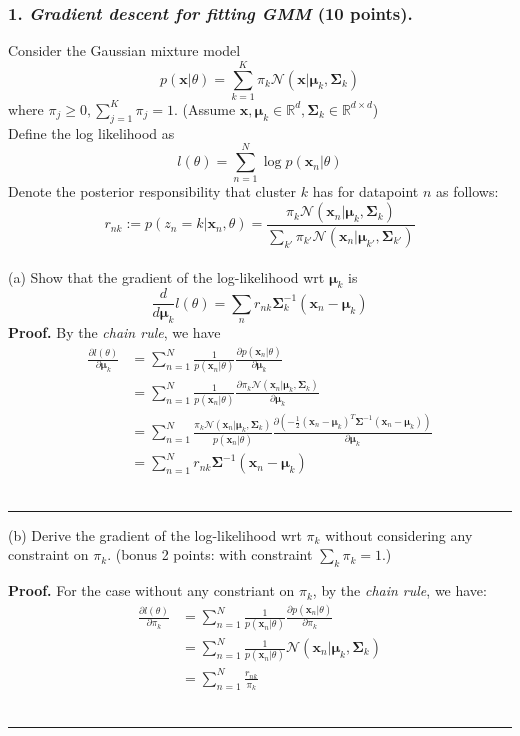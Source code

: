 \documentclass[12pt]{article}%
\newenvironment{proof}[1][Proof]{\textbf{#1.} }{\ \rule{0.5em}{0.5em}}
\newcommand{\PARTIAL}[2]{\frac{\partial #1}{\partial #2}}
\renewcommand{\b}[1]{\boldsymbol{#1}}
\begin{document}
\subsubsection*{1. \textit{Gradient descent for fitting GMM} (10 points).}
Consider the Gaussian mixture model
\[p(\mathbf{x}|\theta)=\sum_{k=1}^K \pi_k \mathcal{N}(\mathbf{x}|\boldsymbol{\mu}_k,\boldsymbol{\Sigma}_k)\]
\indent where $\pi_j\geq 0, \sum_{j=1}^K\pi_j = 1$. (Assume $\mathbf{x},\boldsymbol{\mu}_k\in \mathbb{R}^d,\boldsymbol{\Sigma}_k\in \mathbb{R}^{d\times d}$)
\vspace{1em}
\\
 Define the log likelihood as
\[ l(\theta) = \sum_{n=1}^N \log p(\mathbf{x}_n|\theta)
\]
 Denote the posterior responsibility that cluster $k$ has for datapoint $n$ as follows:
\[
r_{nk}:=p(z_n=k|\mathbf{x}_n,\theta) = \frac{\pi_k\mathcal{N}(\mathbf{x}_n|\boldsymbol{\mu}_k,\boldsymbol{\Sigma}_k)}{\sum_{k'}\pi_{k'}\mathcal{N}(\mathbf{x}_n|\boldsymbol{\mu}_{k'},\boldsymbol{\Sigma}_{k'})}
\]
\\
(a) Show that the gradient of the log-likelihood wrt $\boldsymbol{\mu}_k$ is
	\[ \frac{d}{d\boldsymbol{\mu}_k}l(\theta) = \sum_n r_{nk}\boldsymbol{\Sigma}_k^{-1}(\mathbf{x}_n-\boldsymbol{\mu}_k)
	\]
	\vspace{1em}
    \begin{proof}
        By the {\it chain rule}, we have 
        \begin{align*}
            \PARTIAL{l(\theta)}{\b{\mu}_k}
            &=\sum_{n=1}^N \frac{1}{p(\b{x}_n|\theta)}\PARTIAL{p(\b{x}_n|\theta)}{\b{\mu}_k}\\
            &=\sum_{n=1}^N \frac{1}{p(\b{x}_n|\theta)}\PARTIAL{\pi_k\mathcal{N}(\b{x}_n|\b{\mu}_k,\b{\Sigma}_k)}{\b{\mu}_k}\\
            &=\sum_{n=1}^N \frac{\pi_k\mathcal{N}(\b{x}_n|\b{\mu}_k,\b{\Sigma}_k)}{p(\b{x}_n|\theta)}\PARTIAL{(-\frac{1}{2}(\b{x}_n-\b{\mu}_k)^T\b{\Sigma}^{-1}(\b{x}_n-\b{\mu}_k))}{\b{\mu}_k}\\
            &=\sum_{n=1}^N r_{nk}\b{\Sigma}^{-1}(\b{x}_n-\b{\mu}_k)
        \end{align*}
    \end{proof}
	\vspace{1em}

	(b) Derive the gradient of the log-likelihood wrt $\pi_k$ without considering any constraint on $\pi_k$. (bonus 2 points: with constraint $\sum_k\pi_k=1$.)
	\vspace{1em}

    \begin{proof}
        For the case without any constriant on $\pi_k$, by the {\it chain rule}, we have:
        \begin{align*}
            \PARTIAL{l(\theta)}{\pi_k}
            &=\sum_{n=1}^N \frac{1}{p(\b{x}_n|\theta)}\PARTIAL{p(\b{x}_n|\theta)}{\pi_k}\\
            &=\sum_{n=1}^N \frac{1}{p(\b{x}_n|\theta)}\mathcal{N}(\b{x}_n|\b{\mu}_k,\b{\Sigma}_k)\\
            &=\sum_{n=1}^N \frac{r_{nk}}{\pi_k}
        \end{align*}
    \end{proof}
	\vspace{1em}
\end{document}
